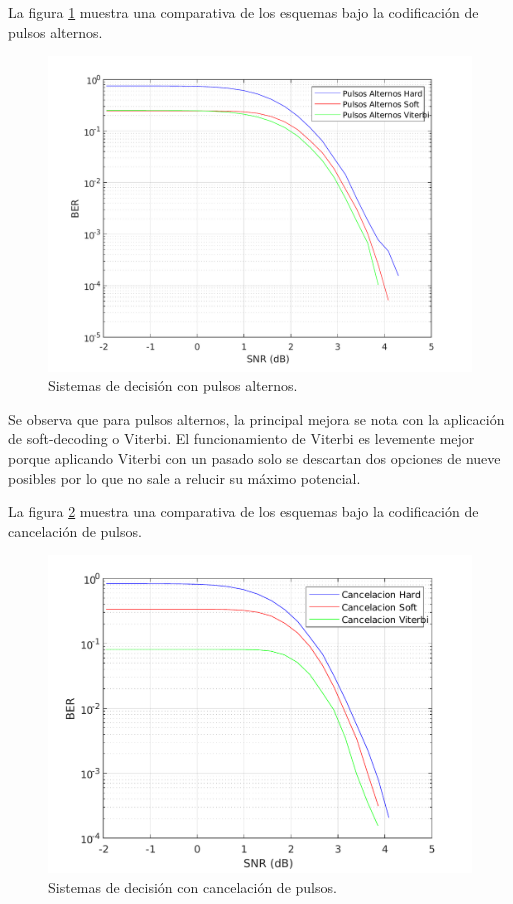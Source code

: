 La figura \ref{alternos} muestra una comparativa de los esquemas bajo 
la codificación de pulsos alternos.

\begin{figure}[ht]
    \centering
    \includegraphics[scale=0.6]{./figuras/alternos.pdf}
    \caption{\small{Sistemas de decisión con pulsos alternos.}}
    \label{alternos}%
\end{figure}

Se observa que para pulsos alternos, la principal mejora se nota con la aplicación 
de soft-decoding o Viterbi. El funcionamiento de Viterbi es levemente mejor porque 
aplicando Viterbi con un pasado solo se descartan dos opciones de nueve posibles por lo 
que no sale a relucir su máximo potencial. 

La figura \ref{cancelacion} muestra una comparativa de los esquemas bajo 
la codificación de cancelación de pulsos.

\begin{figure}[ht]
    \centering
    \includegraphics[scale=0.6]{./figuras/cancelacion.pdf}
    \caption{\small{Sistemas de decisión con cancelación de pulsos.}}
    \label{cancelacion}%
\end{figure}

